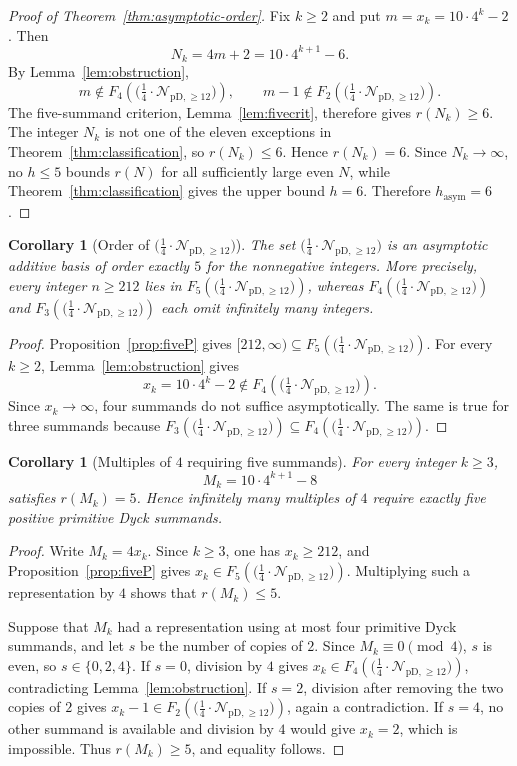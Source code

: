 \documentclass[12pt]{article}
\theoremstyle{plain}
\newtheorem{corollary}[theorem]{Corollary}
\theoremstyle{definition}
\theoremstyle{plain}
\newcommand{\Pset}{%
  \bigl(\tfrac{1}{4}\cdot\mathcal{N}_{\mathrm{pD},\geq 12}\bigr)%
}
\begin{document}
\begin{proof}[Proof of Theorem~\ref{thm:asymptotic-order}]
Fix $k\geq2$ and put $m=x_k=10\cdot4^k-2$.  Then
\[
  N_k=4m+2=10\cdot4^{k+1}-6.
\]
By Lemma~\ref{lem:obstruction},
\[
  m\notin F_4(\Pset),\qquad m-1\notin F_2(\Pset).
\]
The five-summand criterion, Lemma~\ref{lem:fivecrit}, therefore gives
$r(N_k)\geq6$.  The integer $N_k$ is not one of the eleven exceptions in
Theorem~\ref{thm:classification}, so $r(N_k)\leq6$.  Hence $r(N_k)=6$.
Since $N_k\to\infty$, no $h\leq5$ bounds $r(N)$ for all sufficiently large even
$N$, while Theorem~\ref{thm:classification} gives the upper bound $h=6$.
Therefore $h_{\mathrm{asym}}=6$.
\end{proof}

\begin{corollary}[Order of $\Pset$]\label{cor:orderfive}
The set $\Pset$ is an asymptotic additive basis of order exactly $5$ for the
nonnegative integers.  More precisely, every integer $n\geq212$ lies in
$F_5(\Pset)$, whereas $F_4(\Pset)$ and $F_3(\Pset)$ each omit infinitely many
integers.
\end{corollary}

\begin{proof}
Proposition~\ref{prop:fiveP} gives $[212,\infty)\subseteq F_5(\Pset)$.  For
every $k\geq2$, Lemma~\ref{lem:obstruction} gives
\[
  x_k=10\cdot4^k-2\notin F_4(\Pset).
\]
Since $x_k\to\infty$, four summands do not suffice asymptotically.  The same is
true for three summands because $F_3(\Pset)\subseteq F_4(\Pset)$.
\end{proof}

\begin{corollary}[Multiples of $4$ requiring five summands]
\label{cor:five-multiples}
For every integer $k\geq3$,
\[
  M_k=10\cdot4^{k+1}-8
\]
satisfies $r(M_k)=5$.  Hence infinitely many multiples of $4$ require exactly
five positive primitive Dyck summands.
\end{corollary}

\begin{proof}
Write $M_k=4x_k$.  Since $k\geq3$, one has $x_k\geq212$, and
Proposition~\ref{prop:fiveP} gives $x_k\in F_5(\Pset)$.  Multiplying such a
representation by $4$ shows that $r(M_k)\leq5$.

Suppose that $M_k$ had a representation using at most four primitive Dyck
summands, and let $s$ be the number of copies of $2$.  Since
$M_k\equiv0\pmod4$, $s$ is even, so $s\in\{0,2,4\}$.  If $s=0$, division by
$4$ gives $x_k\in F_4(\Pset)$, contradicting Lemma~\ref{lem:obstruction}.  If
$s=2$, division after removing the two copies of $2$ gives
$x_k-1\in F_2(\Pset)$, again a contradiction.  If $s=4$, no other summand is
available and division by $4$ would give $x_k=2$, which is impossible.  Thus
$r(M_k)\geq5$, and equality follows.
\end{proof}
\end{document}
